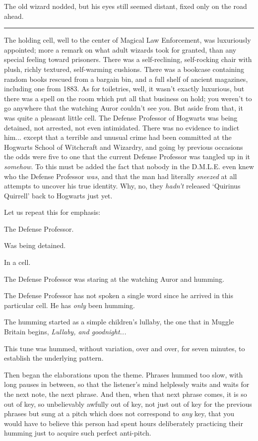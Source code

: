 The old wizard nodded, but his eyes still seemed distant, fixed only on
the road ahead.

\begin{center}\rule{3in}{0.4pt}\end{center}

The holding cell, well to the center of Magical Law Enforcement, was
luxuriously appointed; more a remark on what adult wizards took for
granted, than any special feeling toward prisoners. There was a
self-reclining, self-rocking chair with plush, richly textured,
self-warming cushions. There was a bookcase containing random books
rescued from a bargain bin, and a full shelf of ancient magazines,
including one from 1883. As for toiletries, well, it wasn't exactly
luxurious, but there was a spell on the room which put all that business
on hold; you weren't to go anywhere that the watching Auror couldn't see
you. But aside from that, it was quite a pleasant little cell. The
Defense Professor of Hogwarts was being detained, not arrested, not even
intimidated. There was no evidence to indict him... except that a
terrible and unusual crime had been committed at the Hogwarts School of
Witchcraft and Wizardry, and going by previous occasions the odds were
five to one that the current Defense Professor was tangled up in it
\emph{somehow}. To this must be added the fact that nobody in the
D.M.L.E. even knew who the Defense Professor \emph{was}, and that the
man had literally \emph{sneezed} at all attempts to uncover his true
identity. Why, no, they \emph{hadn't} released `Quirinus Quirrell' back
to Hogwarts just yet.

Let us repeat this for emphasis:

The Defense Professor.

Was being detained.

In a cell.

The Defense Professor was staring at the watching Auror and humming.

The Defense Professor has not spoken a single word since he arrived in
this particular cell. He has \emph{only} been humming.

The humming started as a simple children's lullaby, the one that in
Muggle Britain begins, \emph{Lullaby, and goodnight...}

This tune was hummed, without variation, over and over, for seven
minutes, to establish the underlying pattern.

Then began the elaborations upon the theme. Phrases hummed too slow,
with long pauses in between, so that the listener's mind helplessly
waits and waits for the next note, the next phrase. And then, when that
next phrase comes, it is so out of key, so unbelievably awfully out of
key, not just out of key for the previous phrases but sung at a pitch
which does not correspond to \emph{any} key, that you would have to
believe this person had spent hours deliberately practicing their
humming just to acquire such perfect anti-pitch.

